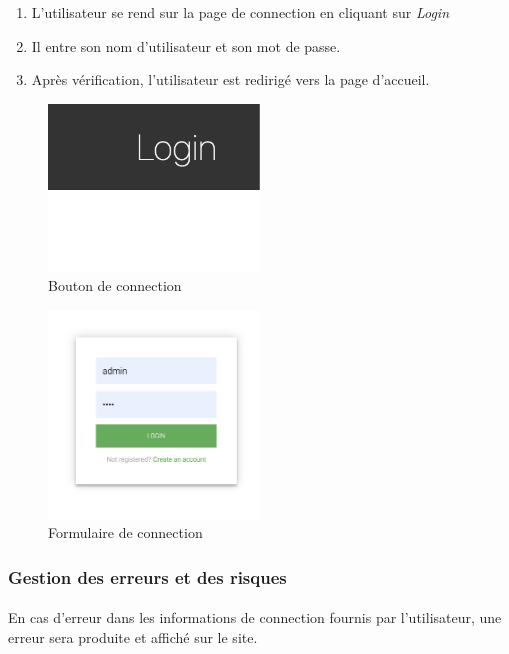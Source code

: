 \begin{enumerate}
	\item L'utilisateur se rend sur la page de connection en cliquant sur \textit{Login}
	\item Il entre son nom d'utilisateur et son mot de passe.
	\item Après vérification, l'utilisateur est redirigé vers la page d'accueil. 
\end{enumerate}

\begin{figure}[h!]
	\includegraphics[width = 0.5\textwidth,center]{Figures/us0-1}
	\caption{Bouton de connection}
\end{figure}

\newpage
\begin{figure}[h!]
	\includegraphics[width = 0.5\textwidth,center]{Figures/us0-2}
	\caption{Formulaire de connection}
\end{figure}

\subsubsection{Gestion des erreurs et des risques}
	\paragraph{}
		En cas d'erreur dans les informations de connection fournis par l'utilisateur, une erreur sera produite et affiché sur le site.

